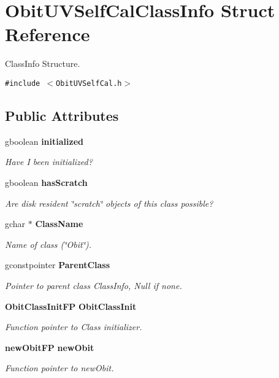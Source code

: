 \section{Obit\-UVSelf\-Cal\-Class\-Info Struct Reference}
\label{structObitUVSelfCalClassInfo}
Class\-Info Structure.  


{\tt \#include $<$Obit\-UVSelf\-Cal.h$>$}

\subsection*{Public Attributes}
\begin{CompactItemize}
\item 
gboolean {\bf initialized}
\begin{CompactList}\small\item\em Have I been initialized? \item\end{CompactList}\item 
gboolean {\bf has\-Scratch}
\begin{CompactList}\small\item\em Are disk resident \char`\"{}scratch\char`\"{} objects of this class possible? \item\end{CompactList}\item 
gchar $\ast$ {\bf Class\-Name}
\begin{CompactList}\small\item\em Name of class (\char`\"{}Obit\char`\"{}). \item\end{CompactList}\item 
gconstpointer {\bf Parent\-Class}
\begin{CompactList}\small\item\em Pointer to parent class Class\-Info, Null if none. \item\end{CompactList}\item 
{\bf Obit\-Class\-Init\-FP} {\bf Obit\-Class\-Init}
\begin{CompactList}\small\item\em Function pointer to Class initializer. \item\end{CompactList}\item 
{\bf new\-Obit\-FP} {\bf new\-Obit}
\begin{CompactList}\small\item\em Function pointer to new\-Obit. \item\end{CompactList}\item 

\end{CompactItemize}
